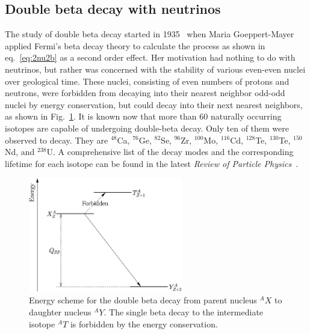 \subsection{Double beta decay with neutrinos}
\label{sec:2n2b}
The study of double beta decay started in 1935~\cite{Goe35} when Maria
Goeppert-Mayer applied Fermi's beta decay theory to calculate the
process as shown in eq.~\ref{eq:2nu2b} as a second order effect. Her
motivation had nothing to do with neutrinos, but rather was concerned
with the stability of various even-even nuclei over geological time.
These nuclei, consisting of even numbers of protons and neutrons, were
forbidden from decaying into their nearest neighbor odd-odd nuclei by
energy conservation, but could decay into their next nearest
neighbors, as shown in Fig.~\ref{fig:ee2oo}. It is known now that more
than 60 naturally occurring isotopes are capable of undergoing
double-beta decay. Only ten of them were observed to decay. They are
$^{48}$Ca, $^{76}$Ge, $^{82}$Se, $^{96}$Zr, $^{100}$Mo, $^{116}$Cd,
$^{128}$Te, $^{130}$Te, $^{150}$Nd, and $^{238}$U. A comprehensive
list of the decay modes and the corresponding lifetime for each
isotope can be found in the latest \emph{Review of Particle
Physics}~\cite{PDG07}.
\begin{figure}[tbhp]
  \centering
  \includegraphics[width=0.6\textwidth]{Espec0nu2b.eps}  
  \caption{Energy scheme for the double beta decay from parent nucleus
$^{A}X$ to daughter nucleus $^{A}Y$. The single beta decay to the
intermediate isotope $^{A}T$ is forbidden by the energy conservation.}
  \label{fig:ee2oo}
\end{figure}

